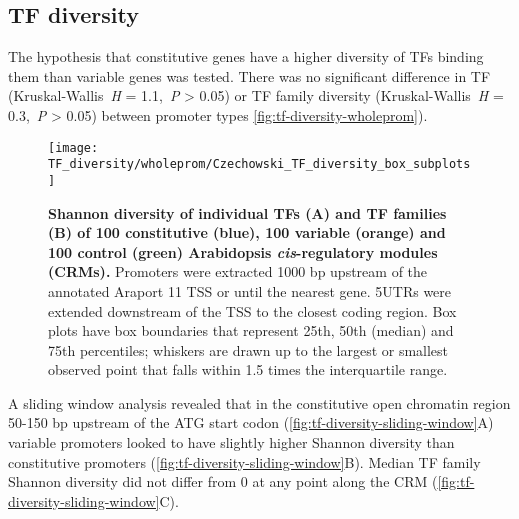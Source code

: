 \documentclass[../main.tex]{subfiles}
\begin{document}
\subsection{TF diversity}
The hypothesis that constitutive genes have a higher diversity of TFs binding them than variable genes was tested.
There was no significant difference in TF (Kruskal\hyp{}Wallis~\textit{H} = 1.1,~\textit{P} \textgreater{} 0.05) or TF family diversity (Kruskal\hyp{}Wallis~\textit{H} = 0.3,~\textit{P} \textgreater{} 0.05) between promoter types \autoref{fig:tf-diversity-wholeprom}).

\begin{figure}[hbt!]
	\begin{center}
		\capstart
		\texttt{[image: TF\_diversity/wholeprom/Czechowski\_TF\_diversity\_box\_subplots]}
		\caption{
			\textbf{Shannon diversity of individual TFs (A) and TF families (B) of 100 constitutive (blue), 100 variable (orange) and 100 control (green) Arabidopsis \textit{cis}\hyp{}regulatory modules (CRMs).}
			Promoters were extracted 1000 bp upstream of the annotated Araport 11 \autocite{chengAraport11CompleteReannotation2017} TSS or until the nearest gene.
			5UTRs were extended downstream of the TSS to the closest coding region.  Box plots have box boundaries that represent 25th, 50th (median) and 75th percentiles; whiskers are drawn up to the largest or smallest observed point that falls within 1.5 times the interquartile range.			
			\label{fig:tf-diversity-wholeprom}
		}
	\end{center}
\end{figure}

A sliding window analysis revealed that in the constitutive open chromatin region 50-150 bp upstream of the ATG start codon (\autoref{fig:tf-diversity-sliding-window}A) variable promoters looked to have slightly higher Shannon diversity than constitutive promoters (\autoref{fig:tf-diversity-sliding-window}B). Median TF family Shannon diversity did not differ from 0 at any point along the CRM (\autoref{fig:tf-diversity-sliding-window}C).
\end{document}
